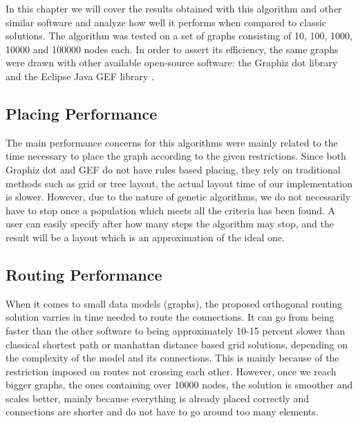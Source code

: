 \label{chap:results}

In this chapter we will cover the results obtained with this algorithm and
other similar software and analyze how well it performs when compared to
classic solutions. The algorithm was tested on a set of graphs consisting of 
10, 100, 1000, 10000 and 100000 nodes each. In order to assert its efficiency, 
the same graphs were drawn with other available open-source software: the Graphiz
dot library \cite{ellson2002graphviz} and the Eclipse Java GEF library \cite{rubel2011eclipse}.

\subsection{Placing Performance}

The main performance concerns for this algorithms were mainly related to the 
time necessary to place the graph according to the given restrictions. Since 
both Graphiz dot and GEF do not have rules based placing, they rely on 
traditional methods such as grid or tree layout, the actual layout time of our 
implementation is slower. However, due to the nature of genetic algorithms, we 
do not necessarily have to stop once a population which meets all the criteria 
has been found. A user can easily specify after how many steps the algorithm may 
stop, and the result will be a layout which is an approximation of the ideal one.

\subsection{Routing Performance}

When it comes to small data models (graphs), the proposed orthogonal routing 
solution varries in time needed to route the connections. It can go from being 
faster than the other software to being approximately 10-15 percent slower than 
classical shortest path or manhattan distance based grid solutions, depending on 
the complexity of the model and its connections. This is mainly because of the 
restriction imposed on routes not crossing each other. However, once we reach 
bigger graphs, the ones containing over 10000 nodes, the solution is smoother and
scales better, mainly because everything is already placed correctly and connections 
are shorter and do not have to go around too many elements.
